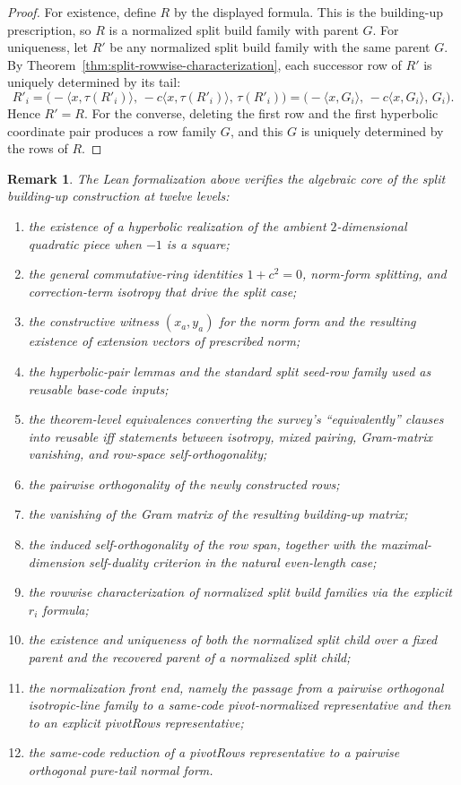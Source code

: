 \documentclass[12pt]{article}
\newtheorem{remark}[theorem]{Remark}
\begin{document}
\begin{proof}
For existence, define $R$ by the displayed formula. This is the building-up prescription, so $R$ is a normalized split build family with parent $G$. For uniqueness, let $R'$ be any normalized split build family with the same parent $G$. By Theorem~\ref{thm:split-rowwise-characterization}, each successor row of $R'$ is uniquely determined by its tail:
\[
R'_i
=
\bigl(-\langle x,\tau(R'_i)\rangle,\,-c\langle x,\tau(R'_i)\rangle,\,\tau(R'_i)\bigr)
=
\bigl(-\langle x,G_i\rangle,\,-c\langle x,G_i\rangle,\,G_i\bigr).
\]
Hence $R'=R$. For the converse, deleting the first row and the first hyperbolic coordinate pair produces a row family $G$, and this $G$ is uniquely determined by the rows of $R$.
\end{proof}

\begin{remark}
The Lean formalization above verifies the algebraic core of the split building-up construction at twelve levels:

\begin{enumerate}
\item the existence of a hyperbolic realization of the ambient $2$-dimensional quadratic piece when $-1$ is a square;
\item the general commutative-ring identities $1+c^2=0$, norm-form splitting, and correction-term isotropy that drive the split case;
\item the constructive witness $(x_a,y_a)$ for the norm form and the resulting existence of extension vectors of prescribed norm;
\item the hyperbolic-pair lemmas and the standard split seed-row family used as reusable base-code inputs;
\item the theorem-level equivalences converting the survey's ``equivalently'' clauses into reusable iff statements between isotropy, mixed pairing, Gram-matrix vanishing, and row-space self-orthogonality;
\item the pairwise orthogonality of the newly constructed rows;
\item the vanishing of the Gram matrix of the resulting building-up matrix;
\item the induced self-orthogonality of the row span, together with the maximal-dimension self-duality criterion in the natural even-length case;
\item the rowwise characterization of normalized split build families via the explicit $r_i$ formula;
\item the existence and uniqueness of both the normalized split child over a fixed parent and the recovered parent of a normalized split child;
\item the normalization front end, namely the passage from a pairwise orthogonal isotropic-line family to a same-code pivot-normalized representative and then to an explicit pivotRows representative;
\item the same-code reduction of a pivotRows representative to a pairwise orthogonal pure-tail normal form.
\end{enumerate}


\end{remark}
\end{document}

